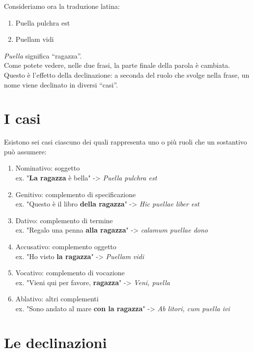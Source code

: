 \documentclass[8pt]{book}
\begin{document}
Consideriamo ora la traduzione latina:

\begin{enumerate}
\item
  Puella pulchra est
\item
  Puellam vidi
\end{enumerate}

\emph{Puella} significa ``ragazza''.\\
Come potete vedere, nelle due frasi, la parte finale della parola è cambiata.\\
Questo è l'effetto della declinazione: a seconda del ruolo che svolge nella frase, un nome viene declinato in diversi ``casi''.

\section{I casi}\label{tocux5f56}

Esistono sei casi ciascuno dei quali rappresenta uno o più ruoli che un sostantivo può assumere:

\begin{enumerate}
\item
  Nominativo: soggetto\\
  ex. "\textbf{La ragazza} è bella" -\textgreater{} \emph{Puella pulchra est}
\item
  Genitivo: complemento di specificazione\\
  ex. "Questo è il libro \textbf{della ragazza}" -\textgreater{} \emph{Hic puellae liber est}
\item
  Dativo: complemento di termine\\
  ex. "Regalo una penna \textbf{alla ragazza}" -\textgreater{} \emph{calamum puellae dono}
\item
  Accusativo: complemento oggetto\\
  ex. "Ho visto \textbf{la ragazza}" -\textgreater{} \emph{Puellam vidi}
\item
  Vocativo: complemento di vocazione\\
  ex. "Vieni qui per favore, \textbf{ragazza}" -\textgreater{} \emph{Veni, puella}
\item
  Ablativo: altri complementi\\
  ex. "Sono andato al mare \textbf{con la ragazza}" -\textgreater{} \emph{Ab litori, cum puella ivi}
\end{enumerate}

\section{Le declinazioni}\label{tocux5f57}
\end{document}
